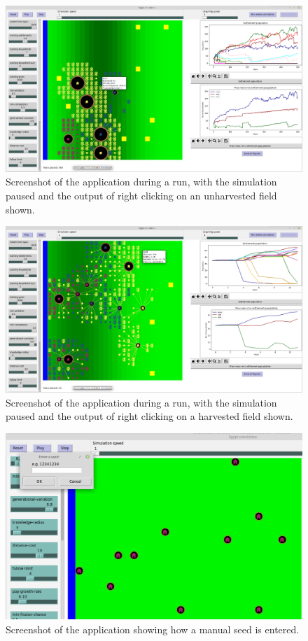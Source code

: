\documentclass[12pt]{article}
\begin{document}
	\begin{figure}[!htb]
		\includegraphics[width=15cm]{RightClickOnNotHarvestedField}
		\caption{Screenshot of the application during a run, with the simulation paused and the output of right clicking on an unharvested field shown.}
		\label{fig:ClickOnUnharvested}
	\end{figure}
	
	\begin{figure}[!htb]
		\includegraphics[width=15cm]{RightClickOnHarvestedField}
		\caption{Screenshot of the application during a run, with the simulation paused and the output of right clicking on a harvested field shown.}
		\label{fig:ClickOnHarvested}
	\end{figure}
	
	\begin{figure}[!htb]
		\includegraphics[width=15cm]{SeedEntry}
		\caption{Screenshot of the application showing how a manual seed is entered.}
		\label{fig:Seed Entry}
	\end{figure}
\end{document}
